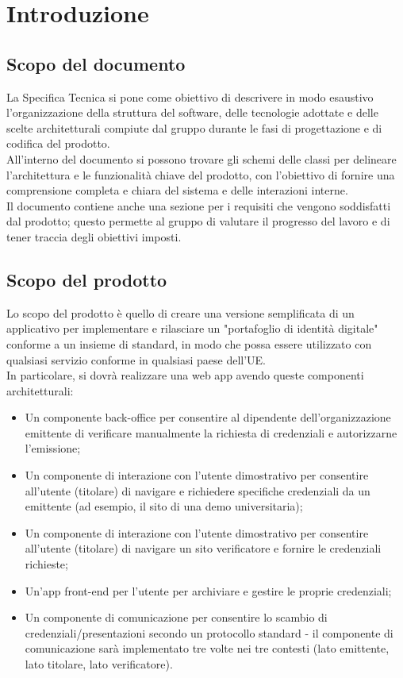 \section{Introduzione}
\subsection{Scopo del documento}
La Specifica Tecnica si pone come obiettivo di descrivere in modo esaustivo l'organizzazione della struttura del software, delle tecnologie adottate e delle scelte architetturali compiute dal gruppo durante le fasi di progettazione e di codifica del prodotto.\\
All’interno del documento si possono trovare gli schemi delle classi per delineare l'architettura e le funzionalità chiave del prodotto, con l'obiettivo di fornire una comprensione completa e chiara del sistema e delle interazioni interne.\\
Il documento contiene anche una sezione per i requisiti che vengono soddisfatti dal prodotto; questo permette al gruppo  di valutare il progresso del lavoro e di tener traccia degli obiettivi imposti.

\subsection{Scopo del prodotto} 
Lo scopo del prodotto è quello di creare una versione semplificata di un applicativo per implementare e rilasciare un "portafoglio di identità digitale" conforme a un insieme di 
standard, in modo che possa essere utilizzato con qualsiasi servizio conforme in qualsiasi paese dell'UE. \\
In particolare, si dovrà realizzare una web app\glo{} avendo queste componenti architetturali:
\begin{itemize}
    \item Un componente back-office per consentire al dipendente dell'organizzazione emittente di verificare\glo{} manualmente la richiesta di credenziali e autorizzarne l'emissione; 
    \item Un componente di interazione con l'utente dimostrativo per consentire all'utente (titolare) di navigare e richiedere specifiche credenziali da un emittente 
(ad esempio, il sito di una demo universitaria); 
    \item Un componente di interazione con l'utente dimostrativo per consentire all'utente (titolare) di navigare un sito verificatore\glo{} e fornire le credenziali richieste;
    \item Un'app front-end per l'utente per archiviare e gestire le proprie credenziali; 
    \item Un componente di comunicazione per consentire lo scambio di credenziali/presentazioni secondo un protocollo standard - il componente di comunicazione sarà implementato 
tre volte nei tre contesti (lato emittente, lato titolare, lato verificatore).
\end{itemize}


